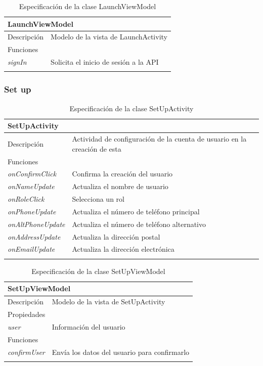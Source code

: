 \vspace{-15pt}
\begin{longtable}{|p{} p{}|}
    \hline
    \multicolumn{2}{|l|}{LaunchViewModel} \\ \hline \hline
    Descripción      & Modelo de la vista de LaunchActivity \\ \hline
    \multicolumn{2}{|l|}{Funciones} \\
    \emph{signIn}  & Solicita el inicio de sesión a la API  \\ \hline
    \caption{Especificación de la clase LaunchViewModel}
    \label{class:app:launch_view_model}
\end{longtable}

\vspace{-30pt}
\subsubsection{Set up}

\begin{longtable}{|p{} p{}|}
    \hline
    \multicolumn{2}{|l|}{SetUpActivity} \\ \hline \hline
    Descripción      & Actividad de configuración de la cuenta de usuario en la creación de esta \\ \hline
    \multicolumn{2}{|l|}{Funciones} \\
    \emph{onConfirmClick}  & Confirma la creación del usuario  \\
    \emph{onNameUpdate}  & Actualiza el nombre de usuario  \\ 
    \emph{onRoleClick}  & Selecciona un rol  \\ 
    \emph{onPhoneUpdate}  & Actualiza el número de teléfono principal \\
    \emph{onAltPhoneUpdate}  & Actualiza el número de teléfono alternativo  \\ 
    \emph{onAddressUpdate}  & Actualiza la dirección postal  \\ 
    \emph{onEmailUpdate}  & Actualiza la dirección electrónica  \\  \hline
    \caption{Especificación de la clase SetUpActivity}
    \label{class:app:setup_activity}
\end{longtable}

\vspace{-20pt}
\begin{longtable}{|p{} p{}|}
    \hline
    \multicolumn{2}{|l|}{SetUpViewModel} \\ \hline \hline
    Descripción      & Modelo de la vista de SetUpActivity \\ \hline
    \multicolumn{2}{|l|}{Propiedades} \\
    \emph{user}  & Información del usuario  \\ \hline
    \multicolumn{2}{|l|}{Funciones} \\
    \emph{confirmUser}  & Envía los datos del usuario para confirmarlo  \\ \hline
    \caption{Especificación de la clase SetUpViewModel}
    \label{class:app:setup_view_model}
\end{longtable}

